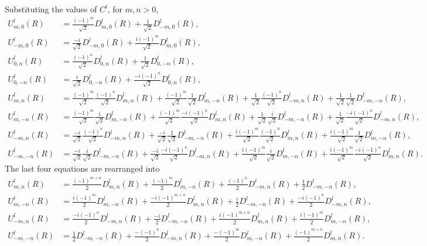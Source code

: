 \documentclass[onecolumn,11pt]{IEEEtran}
\begin{document}
Substituting the values of $C^l$, for $m,n>0$,
\begin{align*}
    U^l_{m,0} (R) &= \frac{(-1)^m}{\sqrt{2}} D^l_{m,0} (R) + \frac{1}{\sqrt{2}} D^l_{-m,0} (R),\\
    U^l_{-m,0} (R) &= \frac{-i}{\sqrt{2}} D^l_{-m,0} (R) + \frac{i(-1)^m}{\sqrt{2}} D^l_{m,0} (R),\\
    U^l_{0,n} (R) &= \frac{(-1)^n}{\sqrt{2}} D^l_{0,n}(R) + \frac{1}{\sqrt{2}} D^l_{0,-n}(R),\\
    U^l_{0,-n} (R) &= \frac{i}{\sqrt{2}} D^l_{0,-n}(R) + \frac{-i(-1)^n}{\sqrt{2}} D^l_{0,n}(R),\\
    U^l_{m,n} (R) &= \frac{(-1)^m}{\sqrt{2}} \frac{(-1)^n}{\sqrt{2}} D^l_{m,n} (R) + \frac{(-1)^m}{\sqrt{2}} \frac{1}{\sqrt{2}} D^l_{m,-n} (R) + \frac{1}{\sqrt{2}} \frac{(-1)^n}{\sqrt{2}} D^l_{-m,n} (R) + \frac{1}{\sqrt{2}} \frac{1}{\sqrt{2}} D^l_{-m,-n} (R),\\
    U^l_{m,-n} (R) &= \frac{(-1)^m}{\sqrt{2}} \frac{i}{\sqrt{2}} D^l_{m,-n} (R) + \frac{(-1)^m}{\sqrt{2}} \frac{-i(-1)^n}{\sqrt{2}} D^l_{m,n} (R) + \frac{1}{\sqrt{2}} \frac{i}{\sqrt{2}} D^l_{-m,-n} (R) + \frac{1}{\sqrt{2}} \frac{-i(-1)^n}{\sqrt{2}} D^l_{-m,n} (R),\\
    U^l_{-m,n} (R) &= \frac{-i}{\sqrt{2}} \frac{(-1)^n}{\sqrt{2}} D^l_{-m,n} (R) + \frac{-i}{\sqrt{2}} \frac{1}{\sqrt{2}} D^l_{-m,-n} (R) + \frac{i(-1)^m}{\sqrt{2}} \frac{(-1)^n}{\sqrt{2}} D^l_{m,n} (R) + \frac{i(-1)^m}{\sqrt{2}} \frac{1}{\sqrt{2}} D^l_{m,-n} (R),\\
    U^l_{-m,-n} (R) &= \frac{-i}{\sqrt{2}} \frac{i}{\sqrt{2}} D^l_{-m,-n} (R) + \frac{-i}{\sqrt{2}} \frac{-i(-1)^n}{\sqrt{2}} D^l_{-m,n} (R) + \frac{i(-1)^m}{\sqrt{2}} \frac{i}{\sqrt{2}} D^l_{m,-n} (R) + \frac{i(-1)^m}{\sqrt{2}} \frac{-i(-1)^n}{\sqrt{2}} D^l_{m,n} (R).
\end{align*}
The last four equations are rearranged into
\begin{align*}
    U^l_{m,n} (R) &= \frac{(-1)^{m+n}}{2}  D^l_{m,n} (R) + \frac{(-1)^m}{2}  D^l_{m,-n} (R) +  \frac{(-1)^n}{2} D^l_{-m,n} (R) + \frac{1}{2}  D^l_{-m,-n} (R),\\
    U^l_{m,-n} (R) &= \frac{i(-1)^m}{2}  D^l_{m,-n} (R) + \frac{-i(-1)^{m+n}}{2} D^l_{m,n} (R) +  \frac{i}{2} D^l_{-m,-n} (R) +  \frac{-i(-1)^n}{2} D^l_{-m,n} (R),\\
    U^l_{-m,n} (R) &=  \frac{-i(-1)^n}{2} D^l_{-m,n} (R) + \frac{-i}{2}  D^l_{-m,-n} (R) + \frac{i(-1)^{m+n}}{2}  D^l_{m,n} (R) + \frac{i(-1)^m}{2}  D^l_{m,-n} (R),\\
    U^l_{-m,-n} (R) &= \frac{1}{2}  D^l_{-m,-n} (R) +  \frac{-(-1)^n}{2} D^l_{-m,n} (R) + \frac{-(-1)^m}{2}  D^l_{m,-n} (R) + \frac{(-1)^{m+n}}{2}  D^l_{m,n} (R).
\end{align*}
\end{document}
